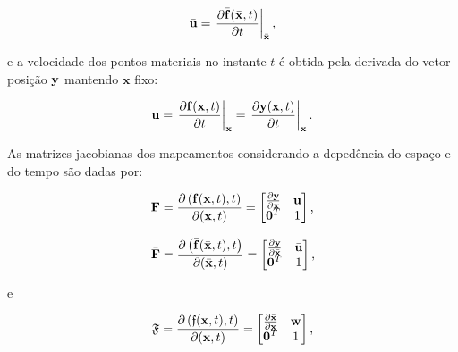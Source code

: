 \documentclass[tese_patricia]{subfiles}%
\begin{document}
\begin{align}
	\bar{\mathbf{u}} = \left. \frac{\partial \bar{\mathbf{f}}(\bar{\mathbf{x}},t)}{\partial t} \right|_{\bar{\mathbf{x}}},
\end{align}

\noindent e a velocidade dos pontos materiais no instante $t$ é obtida pela derivada do vetor posição $\mathbf{y}$ mantendo $\mathbf{x}$ fixo:

\begin{align}
	\mathbf{u} = \left. \frac{\partial \mathbf{f}(\mathbf{x},t)}{\partial t} \right|_{\mathbf{x}} = \left. \frac{\partial \mathbf{y}(\mathbf{x},t)}{\partial t} \right|_{\mathbf{x}}.
\end{align}


As matrizes jacobianas dos mapeamentos considerando a depedência do espaço e do tempo são dadas por:

\begin{equation} \label{eq:ALEJac1}
	\mathbf{F} = \frac{\partial \left(\mathbf{f}(\mathbf{x},t),t\right)}{\partial (\mathbf{x},t)}=
	\begin{bmatrix}
		\frac{\partial {\mathbf{y}}}{\partial {\mathbf{x}}} & \mathbf{u} \\
		\mathbf{0}^T & 1 \\
	\end{bmatrix}
	\text{,}
\end{equation}

\begin{equation} \label{eq:ALEJac2}
	\bar{\mathbf{F}} = \frac{\partial \left(\bar{\mathbf{f}}(\bar{\mathbf{x}},t),t\right)}{\partial (\bar{\mathbf{x}},t)}=
	\begin{bmatrix}
		\frac{\partial {\mathbf{y}}}{\partial {\bar{\mathbf{x}}}} & \bar{\mathbf{u}} \\
		\mathbf{0}^T & 1 \\
	\end{bmatrix}
	\text{,}
\end{equation}

e

\begin{equation} \label{eq:ALEJac3}
	\mathfrak{F} = \frac{\partial \left({\mathfrak{f}}(\mathbf{x},t),t\right)}{\partial (\mathbf{x},t)}=
	\begin{bmatrix}
		\frac{\partial {\bar{\mathbf{x}}}}{\partial {\mathbf{x}}} & \mathbf{w} \\
		\mathbf{0}^T & 1 \\
	\end{bmatrix}
	\text{,}
\end{equation}
\end{document}
